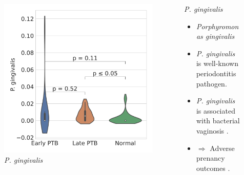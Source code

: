 \documentclass{beamer}
\begin{document}
\begin{frame}[allowframebreaks]
        \begin{columns}
            \begin{column}{0.4 \linewidth}
                \begin{figure}
                    \includegraphics[width=\linewidth]{figures/Step71_Proportion/everything.DADA2.homd.Mouth/P. gingivalis.pdf}
                    \caption{\textit{P. gingivalis}}
                \end{figure}
            \end{column}
            \begin{column}{0.6 \linewidth}
                \begin{block}{\textit{P. gingivalis}}
                    \begin{itemize}
                        \item \textit{Porphyromonas gingivalis}
                        \item \textit{P. gingivalis} is well-known periodontitis pathogen.
                        \item \textit{P. gingivalis} is associated with bacterial vaginosis \cite{Porphyromonas-1}.
                        \item {} $\Rightarrow$ Adverse prenancy outcomes \cite{Porphyromonas-2}.
                    \end{itemize}
                \end{block}
            \end{column}
        \end{columns}


\end{frame}
\end{document}
